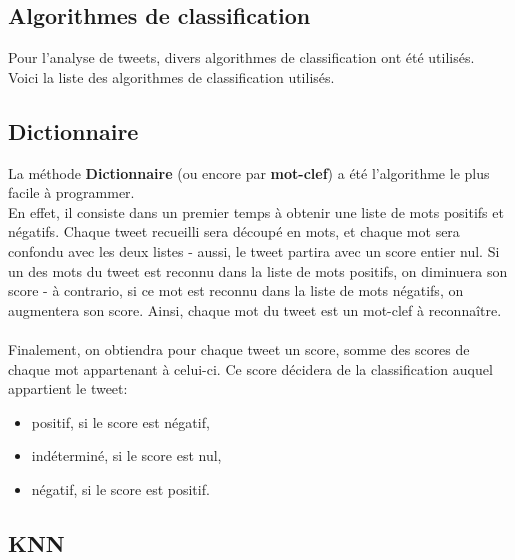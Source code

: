 \documentclass[pdftex,12pt,a4paper]{report}
\begin{document}
\begin{spacing}{1.2}
\chapter{Algorithmes de classification}

Pour l'analyse de tweets, divers algorithmes de classification ont été utilisés.\\
Voici la liste des algorithmes de classification utilisés.

\section{Dictionnaire}

La méthode \textbf{Dictionnaire} (ou encore par \textbf{mot-clef}) a été l'algorithme le plus facile à programmer.\\
En effet, il consiste dans un premier temps à obtenir une liste de mots positifs et négatifs. Chaque tweet recueilli sera découpé en mots, et chaque mot sera confondu avec les deux listes - aussi, le tweet partira avec un score entier nul. Si un des mots du tweet est reconnu dans la liste de mots positifs, on diminuera son score - à contrario, si ce mot est reconnu dans la liste de mots négatifs, on augmentera son score. Ainsi, chaque mot du tweet est un mot-clef à reconnaître.
\\
\\
Finalement, on obtiendra pour chaque tweet un score, somme des scores de chaque mot appartenant à celui-ci. Ce score décidera de la classification auquel appartient le tweet:
\begin{itemize}
\item{positif, si le score est négatif,}
\item{indéterminé, si le score est nul,}
\item{négatif, si le score est positif.}
\end{itemize}

\section{KNN}


\end{spacing}
\end{document}
